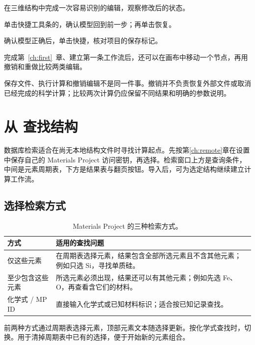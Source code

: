 \begin{steps}
\item 在三维结构中完成一次容易识别的编辑，观察修改后的状态。
\item 单击快捷工具条的，确认模型回到前一步；再单击恢复。
\item 确认模型正确后，单击快捷，核对项目的保存标记。
\end{steps}

完成第~\ref{ch:first}~章、建立第一条工作流后，还可以在画布中移动一个节点，再用撤销和重做比较两类编辑。

保存文件、执行计算和撤销编辑不是同一件事。撤销并不负责恢复外部文件或取消已经完成的科学计算；比较两次计算仍应保留不同结果和明确的参数说明。

\section{从  查找结构}\label{sec:mp-search}

数据库检索适合在尚无本地结构文件时寻找计算起点。先按第\ref{ch:remote}章在设置中保存自己的 Materials Project 访问密钥，再选择。检索窗口上方是查询条件，中间是元素周期表，下方是结果表与翻页按钮。导入后，可为选定结构继续建立计算工作流。

\subsection{选择检索方式}

\begin{table}[htbp]
\centering
\caption{Materials Project 的三种检索方式。}
\begin{tabularx}{\linewidth}{lX}
\toprule
方式 & 适用的查找问题 \\
\midrule
仅这些元素 & 在周期表选择元素，结果包含全部所选元素且不含其他元素；例如只选 Si，寻找单质硅。 \\
至少包含这些元素 & 所选元素必须出现，结果还可以有其他元素；例如先选 Fe、O，再查看含它们的材料。 \\
化学式 / MP ID & 直接输入化学式或已知材料标识；适合按已知记录查找。 \\
\bottomrule
\end{tabularx}
\end{table}

前两种方式通过周期表选择元素，顶部元素文本随选择更新。按化学式查找时，切换。用于清掉周期表中已有的选择，便于开始新的元素组合。

